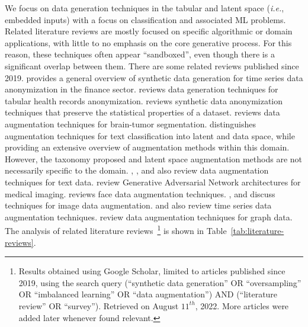 We focus on data generation techniques in the tabular and latent space
(\textit{i.e.}, embedded inputs) with a focus on classification and associated
ML problems. Related literature reviews are mostly focused on specific
algorithmic or domain applications, with little to no emphasis on the core
generative process. For this reason, these techniques often appear
``sandboxed'', even though there is a significant overlap between them. There
are some related reviews published since 2019. \citet{assefa2020generating}
provides a general overview of synthetic data generation for time series data
anonymization in the finance sector. \citet{hernandez2022synthetic} reviews
data generation techniques for tabular health records anonymization.
\citet{raghunathan2021synthetic} reviews synthetic data anonymization
techniques that preserve the statistical properties of a dataset.
\citet{nalepa2019data} reviews data augmentation techniques for brain-tumor
segmentation. \citet{bayer2021survey} distinguishes augmentation techniques
for text classification into latent and data space, while providing an
extensive overview of augmentation methods within this domain. However, the
taxonomy proposed and latent space augmentation methods are not necessarily
specific to the domain. \citet{shorten2021text}, \citet{chen2021empirical},
\citet{feng2021survey} and \citet{liu2020survey} also review data augmentation
techniques for text data.  \citet{yi2019generative} review Generative
Adversarial Network architectures for medical imaging. \citet{wang2020survey}
reviews face data augmentation techniques. \citet{shorten2019survey},
\citet{khosla2020enhancing} and \citet{khalifa2021comprehensive} discuss
techniques for image data augmentation.  \citet{iwana2021empirical} and
\citet{wen2020time} also review time series data augmentation techniques.
\citet{zhao2022graph} review data augmentation techniques for graph data. The
analysis of related literature reviews~\footnote{Results obtained using Google
    Scholar, limited to articles published since 2019, using the search query
    {\selectfont (``synthetic data generation'' OR
        ``oversampling'' OR ``imbalanced learning'' OR ``data augmentation'')
        AND (``literature review'' OR ``survey'')}. Retrieved on August
    $11^{th}$, 2022. More articles were added later whenever found relevant.
} is shown in Table~\ref{tab:literature-reviews}.

